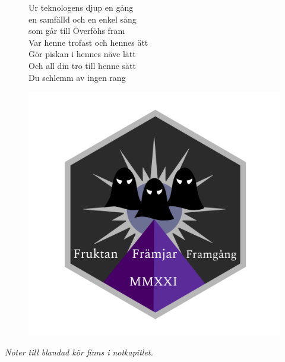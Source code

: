 \documentclass[a6paper,10pt]{article}
\begin{document}
\setlength{\oddsidemargin}{-0.47in}
\noindent
\begin{center}
\end{center}
\vspace{-15pt}
\begin{figure}[!h]
\begin{minipage}{0.6\linewidth}
\small Ur teknologens djup en gång\\
en samfälld och en enkel sång\\
som går till Överföhs fram
\vspace{5pt}\\
Var henne trofast och hennes ätt\\
Gör piskan i hennes näve lätt\\
Och all din tro till henne sätt\\
Du schlemm av ingen rang
\end{minipage}
\begin{minipage}{0.38\linewidth}
\includegraphics[width=\textwidth]{loggan.png}
\end{minipage}
\end{figure}
\vspace{-10pt}
\vspace{10pt}
\begin{center}
\footnotesize\textit{Noter till blandad kör finns i notkapitlet.}
\end{center}
\end{document}

